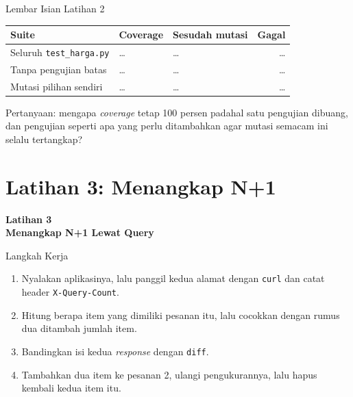 \documentclass[aspectratio=169, table, 12pt]{beamer}
\begin{document}
\begin{frame}{{\Large Lembar Isian Latihan 2}}
  \vspace{4pt}
  \centering
  {\footnotesize
  \begin{tabularx}{\textwidth}{Yllr}
    \hline
    \textbf{Suite} & \textbf{Coverage} & \textbf{Sesudah mutasi} & \textbf{Gagal} \\
    \hline
    Seluruh \texttt{test\_harga.py} & \dots & \dots & \dots \\
    \hline
    Tanpa pengujian batas & \dots & \dots & \dots \\
    \hline
    Mutasi pilihan sendiri & \dots & \dots & \dots \\
    \hline
  \end{tabularx}}

  \vspace{6pt}
  {\footnotesize Pertanyaan: mengapa \textit{coverage} tetap 100 persen
  padahal satu pengujian dibuang, dan pengujian seperti apa yang perlu
  ditambahkan agar mutasi semacam ini selalu tertangkap?}
\end{frame}

\section{Latihan 3: Menangkap N+1}

\begin{frame}{\hfill}
  \centering
  \Huge{\textbf{Latihan 3\\Menangkap N+1 Lewat Query}}
\end{frame}

\begin{frame}{{\Large Langkah Kerja}}
  \vspace{6pt}
  \begin{enumerate}
    \item Nyalakan aplikasinya, lalu panggil kedua alamat dengan
          \texttt{curl} dan catat header \texttt{X-Query-Count}.
    \item Hitung berapa item yang dimiliki pesanan itu, lalu cocokkan dengan
          rumus dua ditambah jumlah item.
    \item Bandingkan isi kedua \textit{response} dengan \texttt{diff}.
    \item Tambahkan dua item ke pesanan 2, ulangi pengukurannya, lalu hapus
          kembali kedua item itu.
  \end{enumerate}
\end{frame}
\end{document}

